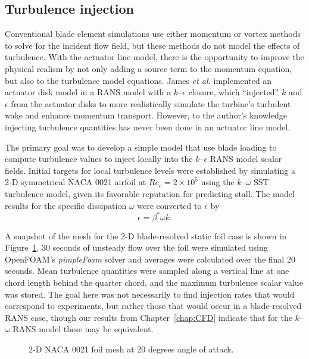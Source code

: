 \subsection{Turbulence injection}

Conventional blade element simulations use either momentum or vortex methods to
solve for the incident flow field, but these methods do not model the effects of
turbulence. With the actuator line model, there is the opportunity to improve
the physical realism by not only adding a source term to the momentum equation,
but also to the turbulence model equations. James \emph{et al.} \cite{James2010}
implemented an actuator disk model in a RANS model with a $k$--$\epsilon$
closure, which ``injected'' $k$ and $\epsilon$ from the actuator disks to more
realistically simulate the turbine's turbulent wake and enhance momentum
transport. However, to the author's knowledge injecting turbulence quantities
has never been done in an actuator line model.

The primary goal was to develop a simple model that use blade loading to compute
turbulence values to inject locally into the $k$--$\epsilon$ RANS model scalar
fields. Initial targets for local turbulence levels were established by
simulating a 2-D symmetrical NACA 0021 airfoil at $Re_c = 2 \times 10^5$ using
the $k$--$\omega$ SST turbulence model, given its favorable reputation for
predicting stall. The model results for the specific dissipation $\omega$ were
converted to $\epsilon$ by \cite{Wilcox1994}
\begin{equation}
    \epsilon = \beta^* \omega k.
\end{equation}

A snapshot of the mesh for the 2-D blade-resolved static foil case is shown in
Figure~\ref{fig:NACA-foil-mesh}. 30 seconds of unsteady flow over the foil were
simulated using OpenFOAM's \textit{pimpleFoam} solver and averages were
calculated over the final 20 seconds. Mean turbulence quantities were sampled
along a vertical line at one chord length behind the quarter chord, and the
maximum turbulence scalar value was stored. The goal here was not necessarily to
find injection rates that would correspond to experiments, but rather those that
would occur in a blade-resolved RANS case, though our results from
Chapter~\ref{chap:CFD} indicate that for the $k$--$\omega$ RANS model these may
be equivalent.

\begin{figure}
    \centering
    
    \caption{2-D NACA 0021 foil mesh at 20 degrees angle of attack.}
    
    \label{fig:NACA-foil-mesh}
\end{figure}

